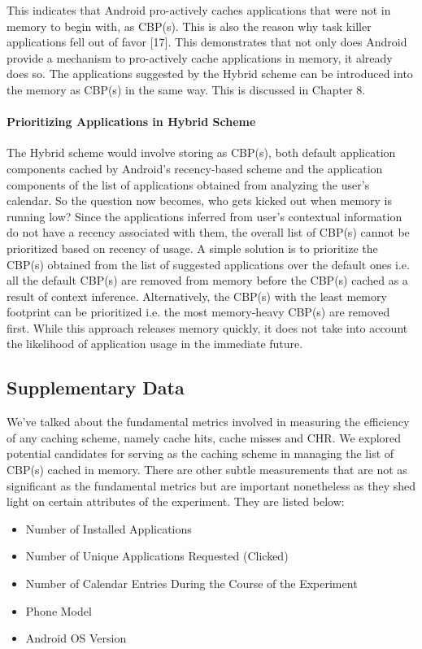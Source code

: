 \documentclass[12pt]{uthesis-v12}  %
\begin{document}
					This indicates that Android pro-actively caches applications that were not in memory to begin with, as CBP(s). This is also the reason why task killer applications fell out of favor [17]. This demonstrates that not only does Android provide a mechanism to pro-actively cache applications in memory, it already does so. The applications suggested by the Hybrid scheme can be introduced into the memory as CBP(s) in the same way. This is discussed in Chapter 8.

				\paragraph{Prioritizing Applications in Hybrid Scheme}	
					The Hybrid scheme would involve storing as CBP(s), both default application components cached by Android's recency-based scheme and the application components of the list of applications obtained from analyzing the user's calendar. So the question now becomes, who gets kicked out when memory is running low? Since the applications inferred from user's contextual information do not have a recency associated with them, the overall list of CBP(s) cannot be prioritized based on recency of usage. A simple solution is to prioritize the CBP(s) obtained from the list of suggested applications over the default ones i.e. all the default CBP(s) are removed from memory before the CBP(s) cached as a result of context inference. Alternatively, the CBP(s) with the least memory footprint can be prioritized i.e. the most memory-heavy CBP(s) are removed first. While this approach releases memory quickly, it does not take into account the likelihood of application usage in the immediate future.
					
		\subsection{Supplementary Data}
			We've talked about the fundamental metrics involved in measuring the efficiency of any caching scheme, namely cache hits, cache misses and CHR. We explored potential candidates for serving as the caching scheme in managing the list of CBP(s) cached in memory. There are other subtle measurements that are not as significant as the fundamental metrics but are important nonetheless as they shed light on certain attributes of the experiment. They are listed below:
			
			\begin{itemize}
				\item Number of Installed Applications
				\item Number of Unique Applications Requested (Clicked)
				\item Number of Calendar Entries During the Course of the Experiment
				\item Phone Model
				\item Android OS Version
			\end{itemize} 
			
\end{document}
